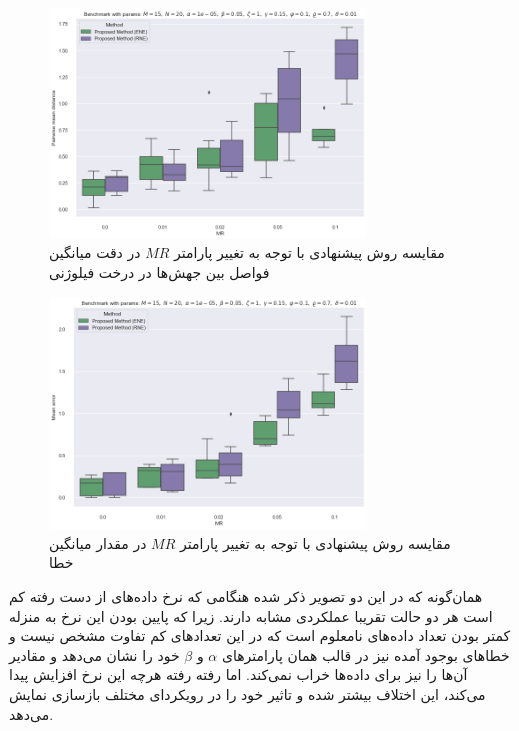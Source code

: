 \begin{figure}[!ht]
	\centering
	\includegraphics[width=0.75\textwidth]{img/chaps/er/comp_change_MR_pwd}
	\caption{‌مقایسه روش پیشنهادی با توجه به تغییر پارامتر $MR$ در دقت میانگین فواصل بین جهش‌ها در درخت فیلوژنی}
	\label{fig:ch_er:comp_change_MR_pwd}
\end{figure}
\begin{figure}[!ht]
	\centering
	\includegraphics[width=0.75\textwidth]{img/chaps/er/comp_change_MR_me}
	\caption{‌مقایسه روش پیشنهادی با توجه به تغییر پارامتر $MR$ در مقدار میانگین خطا}
	\label{fig:ch_er:comp_change_MR_me}
\end{figure}
\noindent
همان‌گونه که در این دو تصویر ذکر شده هنگامی که نرخ داده‌های از دست رفته کم است هر دو حالت تقریبا عملکردی مشابه دارند. زیرا که پایین بودن این نرخ به منزله کمتر بودن تعداد داده‌های نامعلوم است که در این تعدادهای کم تفاوت مشخص نیست و خطاهای بوجود آمده نیز در قالب همان پارامترهای $\alpha$ و $\beta$ خود را نشان می‌دهد و مقادیر آن‌ها را نیز برای داده‌ها خراب نمی‌کند. اما رفته رفته هرچه این نرخ افزایش پیدا می‌کند، این اختلاف بیشتر شده و تاثیر خود را در رویکردای مختلف بازسازی نمایش می‌دهد.

